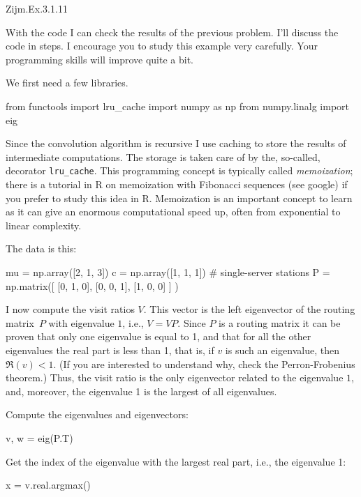 \begin{exercise}
Zijm.Ex.3.1.11
\begin{solution}
  With the code I can check the results of the previous problem.  I'll
  discuss the code in steps. I encourage you to study this example very carefully. Your
  programming skills will improve quite a bit. 

We first need a few libraries. 

\begin{pyconsole}
from functools import lru_cache
import numpy as np
from numpy.linalg import eig
  
\end{pyconsole}

Since the convolution algorithm is recursive I use caching to store
the results of intermediate computations. The storage is taken care of
by the, so-called, decorator \texttt{lru\_cache}. This programming
concept is typically called \emph{memoization}; there is a tutorial in
R on memoization with Fibonacci sequences (see google) if you prefer
to study this idea in R. Memoization is an important concept to learn
as it can give an enormous computational speed up, often from
exponential to linear complexity.

The data is this:

\begin{pyconsole}
mu = np.array([2, 1, 3])
c = np.array([1, 1, 1]) # single-server stations
P = np.matrix([
    [0, 1, 0],
    [0, 0, 1],
    [1, 0, 0]
]
)
  
\end{pyconsole}

I now compute the visit ratios $V$. This vector is the left
eigenvector of the routing matrix~$P$ with eigenvalue $1$, i.e.,
$V=VP$. Since $P$ is a routing matrix it can be proven that only one
eigenvalue is equal to 1, and that for all the other eigenvalues the
real part is less than 1, that is, if $v$ is such an eigenvalue, then
$\Re(v) < 1$. (If you are interested to understand why, check
the Perron-Frobenius theorem.) Thus, the visit ratio is the only
eigenvector related to the eigenvalue $1$, and, moreover, the
eigenvalue 1 is the largest of all eigenvalues.

Compute the eigenvalues and eigenvectors:

\begin{pyconsole}
v, w = eig(P.T)
\end{pyconsole}

Get the index of the  eigenvalue with the largest real part, i.e., the  eigenvalue 1:
\begin{pyconsole}
x = v.real.argmax() 
\end{pyconsole}


\end{solution}
\end{exercise}
